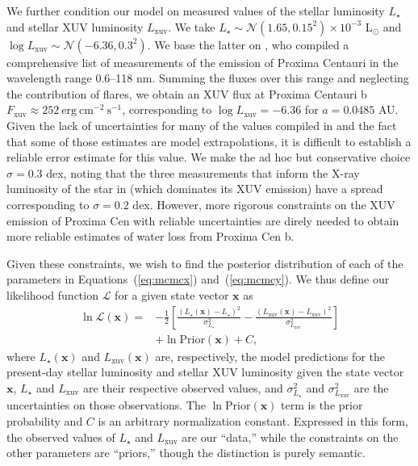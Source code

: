 \documentclass[preprint,12pt]{aastex}
\begin{document}
We further condition our model on measured values of the stellar luminosity $L_\star$ and 
stellar XUV luminosity $L_\mathrm{xuv}$. We take
$L_\star \sim \mathcal{N}(1.65, 0.15^2) \times 10^{-3}$ L$_\odot$ \citep{Demory09} and 
$\log L_\mathrm{xuv} \sim \mathcal{N}(-6.36, 0.3^2)$. We base the latter on \cite{Ribas16}, who compiled a comprehensive
list of measurements of the emission of Proxima Centauri in the wavelength range 0.6--118 nm. Summing the fluxes over
this range and neglecting the contribution of flares, we obtain an XUV flux at Proxima Centauri b 
$F_\mathrm{xuv} \approx 252\ \mathrm{erg\ cm^{-2}\ s^{-1}}$, corresponding to $\log L_\mathrm{xuv} = -6.36$ for $a = 0.0485$ AU. Given the
lack of uncertainties for many of the values compiled in \cite{Ribas16} and the fact that some of those estimates
are model extrapolations, it is difficult to establish a reliable error estimate for this value. We make the 
ad hoc but conservative choice $\sigma = 0.3$ dex, noting that the three measurements that inform the X-ray luminosity 
of the star in \cite{Ribas16} (which dominates its XUV emission) have a spread corresponding to $\sigma = 0.2$ dex. 
However, more rigorous constraints on the XUV emission of Proxima Cen with reliable uncertainties are direly needed
to obtain more reliable estimates of water loss from Proxima Cen b.

Given these constraints, we wish to find the posterior distribution of each of the parameters in Equations~(\ref{eq:mcmcx}) 
and~(\ref{eq:mcmcy}). We thus define our likelihood function $\mathcal{L}$ for a given state vector $\mathbf{x}$ as
%
\begin{align}
\ln \mathcal{L}(\mathbf{x}) = &- \frac{1}{2}\left[\frac{(L_\mathrm{\star}(\mathbf{x}) - L_\mathrm{\star})^2}{\sigma_{L_\star}^2}
                              - \frac{(L_\mathrm{xuv}(\mathbf{x}) - L_\mathrm{xuv})^2}{\sigma_{L_\mathrm{xuv}}^2}\right]
                                \nonumber\\
                             &+ \ln \mathrm{Prior}(\mathbf{x}) + C,
\end{align}
%
where $L_\mathrm{\star}(\mathbf{x})$ and $L_\mathrm{xuv}(\mathbf{x})$ are, respectively, the model predictions for the present-day 
stellar luminosity and stellar XUV luminosity given the state vector $\mathbf{x}$, $L_\mathrm{\star}$ and $L_\mathrm{xuv}$ are
their respective observed values, and $\sigma_{L_\star}^2$ and $\sigma_{L_\mathrm{xuv}}^2$ are the uncertainties on those observations. The
$\ln \mathrm{Prior}(\mathbf{x})$ term is the prior probability and $C$ is an arbitrary normalization constant. Expressed in this form,
the observed values of $L_\mathrm{\star}$ and $L_\mathrm{xuv}$ are our ``data,'' while the constraints on the other parameters
are ``priors,'' though the distinction is purely semantic.
\end{document}
